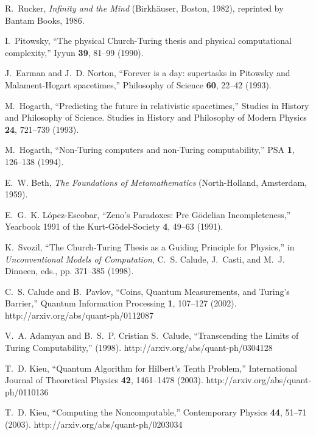 \documentclass[12pt]{article}
\begin{document}
\begin{thebibliography}{10}
R.~Rucker, {\em Infinity and the Mind\/} (Birkh{\"{a}}user, Boston, 1982),
  reprinted by Bantam Books, 1986.

I.~Pitowsky, \enquote{The physical {C}hurch-{T}uring thesis and physical
  computational complexity,} Iyyun {\bf 39}, 81--99 (1990).

J.~Earman and J.~D. Norton, \enquote{Forever is a day: supertasks in {P}itowsky
  and {M}alament-{H}ogart spacetimes,} Philosophy of Science {\bf 60}, 22--42
  (1993).

M.~Hogarth, \enquote{Predicting the future in relativistic spacetimes,} Studies
  in History and Philosophy of Science. Studies in History and Philosophy of
  Modern Physics {\bf 24}, 721--739 (1993).

M.~Hogarth, \enquote{Non-{T}uring computers and non-{T}uring computability,}
  PSA {\bf 1}, 126--138 (1994).

E.~W. Beth, {\em The Foundations of Metamathematics\/} (North-Holland,
  Amsterdam, 1959).

E.~G.~K. L{\'{o}}pez-Escobar, \enquote{{Z}eno's Paradoxes: Pre {G}{\"{o}}delian
  Incompleteness,} Yearbook 1991 of the Kurt-G{\"{o}}del-Society {\bf 4},
  49--63 (1991).

K.~Svozil, \enquote{The {C}hurch-{T}uring Thesis as a Guiding Principle for
  Physics,} in {\em Unconventional Models of Computation\/}, C.~S. Calude,
  J.~Casti, and M.~J. Dinneen, eds.,  pp. 371--385 (1998).

C.~S. Calude and B.~Pavlov, \enquote{Coins, Quantum Measurements, and
  {T}uring's Barrier,} Quantum Information Processing {\bf 1}, 107--127 (2002).
\newline http://arxiv.org/abs/quant-ph/0112087

V.~A. Adamyan and B.~S.~P. Cristian S.~Calude, \enquote{Transcending the Limits
  of {T}uring Computability,}  (1998).
\newline http://arxiv.org/abs/quant-ph/0304128

T.~D. Kieu, \enquote{Quantum Algorithm for {H}ilbert's Tenth Problem,}
  International Journal of Theoretical Physics {\bf 42}, 1461--1478 (2003).
\newline http://arxiv.org/abs/quant-ph/0110136

T.~D. Kieu, \enquote{Computing the Noncomputable,} Contemporary Physics {\bf
  44}, 51--71 (2003).
\newline http://arxiv.org/abs/quant-ph/0203034


\end{thebibliography}
\end{document}
